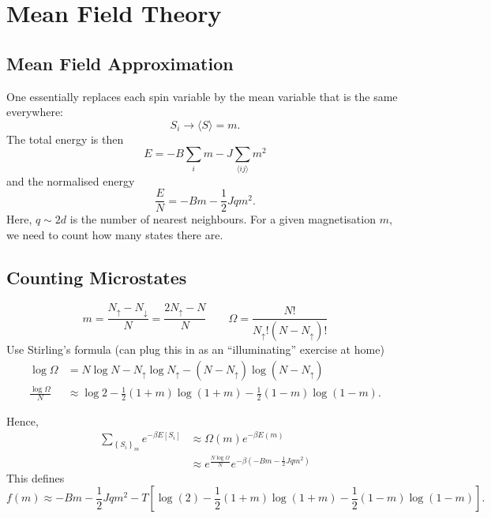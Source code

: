 \section{Mean Field Theory}%
\label{sec:mean_field_theory}

\subsection{Mean Field Approximation}%
\label{sub:mean_field_approximation}

One essentially replaces each spin variable by the mean variable that is the same everywhere:
  \begin{equation}
    S_i \rightarrow \langle S \rangle = m.
  \end{equation}
  The total energy is then
  \begin{equation}
    E = -B \sum_i m - J \sum_{\langle i j \rangle} m^2
  \end{equation}
  and the normalised energy
  \begin{equation}
    \frac{E}{N} = -B m - \frac{1}{2} J q m^2.
  \end{equation}
  Here, $q \sim 2d$ is the number of nearest neighbours. For a given magnetisation $m$, we need to count how many states there are.

\subsection{Counting Microstates}%
\label{sub:counting_microstates}

\begin{equation}
  m = \frac{N_\uparrow - N_\downarrow}{N} = \frac{2N_\uparrow - N}{N} \qquad \Omega = \frac{N!}{N_\uparrow ! (N-N_\uparrow)!}
\end{equation}
Use Stirling's formula (can plug this in as an ``illuminating'' exercise at home)
\begin{align}
  \log\Omega &= N \log N - N_{\uparrow} \log N_{\uparrow} - (N - N_{\uparrow}) \log (N - N_{\uparrow}) \\
  \frac{\log\Omega}{N} &\approx \log 2 - \frac{1}{2}(1+m)\log(1+m) - \frac{1}{2}(1-m) \log(1-m).
\end{align}

Hence,
\begin{align}
  \sum_{\left\{ S_i \right\}_{m}} e^{-\beta E[S_i]} &\approx \Omega(m) e^{-\beta E(m)} \\
  &\approx e^{\frac{N \log \Omega}{N}} e^{-\beta \left( -Bm - \frac{1}{2} Jqm^2 \right)}
\end{align}
This defines
\begin{equation}
  f(m) \approx - Bm - \frac{1}{2} Jq m^2 - T \left[ \log(2) - \frac{1}{2}(1+m)\log(1+m) - \frac{1}{2}(1-m) \log(1-m) \right].
\end{equation}

